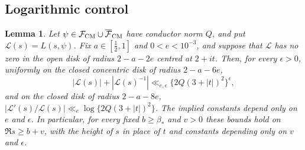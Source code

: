\documentclass[11pt]{article}
\numberwithin{equation}{section}
\newtheorem{lemma}{Lemma}
\begin{document}
\subsection{Logarithmic control}\label{sec:s2-log}
\begin{lemma}\label{lem:s2-logcontrol}
Let $\psi\in\mathcal F_{\rm CM}\cup\overline{\mathcal F}_{\rm CM}$ have conductor norm $Q$, and put
$\mathcal L(s)=L(s,\psi)$. Fix $a\in[\frac12,1]$ and $0<e<10^{-3}$, and suppose that $\mathcal L$ has no zero in
the open disk of radius $2-a-2e$ centred at $2+it$. Then, for every $\epsilon>0$, uniformly on the closed
concentric disk of radius $2-a-6e$,
\begin{equation}\label{eq:d158}
 |\mathcal L(s)|+|\mathcal L(s)^{-1}|\ll_{e,\epsilon}\{2Q(3+|t|)^2\}^\epsilon,
\end{equation}
and on the closed disk of radius $2-a-8e$,
$|\mathcal L'(s)/\mathcal L(s)|\ll_e\log\{2Q(3+|t|)^2\}$. The implied constants depend only on $e$ and $\epsilon$.
In particular, for every fixed $b\ge\beta_*$ and $v>0$ these bounds hold on $\Re s\ge b+v$, with the height of
$s$ in place of $t$ and constants depending only on $v$ and $\epsilon$.
\end{lemma}
\end{document}
